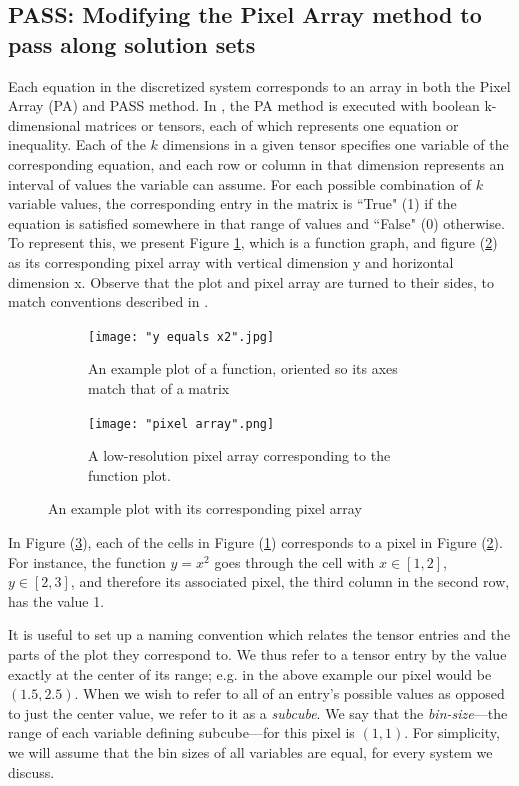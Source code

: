 \documentclass[11pt]{article}
\begin{document}
\subsection{PASS: Modifying the Pixel Array method to pass along solution sets}\label{sec:PASS}

Each equation in the discretized system corresponds to an array in both the Pixel Array (PA) and PASS method. In \citep{Introduction_to_PA}, the PA method is executed with boolean k-dimensional matrices or tensors, each of which represents one equation or inequality. Each of the $k$ dimensions in a given tensor specifies one variable of the corresponding equation, and each row or column in that dimension represents an interval of values the variable can assume. For each possible combination of $k$ variable values, the corresponding entry in the matrix is ``True" (1) if the equation is satisfied somewhere in that range of values and ``False" (0) otherwise. To represent this, we present Figure \cref{sample_function}, which is a function graph, and figure (\cref{sample_pixel_array}) as its corresponding pixel array with vertical dimension y and horizontal dimension x. Observe that the plot and pixel array are turned to their sides, to match conventions described in \citep{Introduction_to_PA}.

\begin{figure}[h]
\begin{subfigure}{.4\textwidth}
  \centering
  \captionsetup{width=0.8\textwidth}
  \texttt{[image: "y equals x2".jpg]}
  \caption{An example plot of a function, oriented so its axes match that of a matrix}
  \label{sample_function}
\end{subfigure}%
\begin{subfigure}{.4\textwidth}
  \centering
  \captionsetup{width=0.84\textwidth}
  \texttt{[image: "pixel array".png]}
  \caption{A low-resolution pixel array corresponding to the function plot.}
  \label{sample_pixel_array}
\end{subfigure}%
\caption{An example plot with its corresponding pixel array}
\label{plot_and_pa}
\end{figure}

In Figure (\ref{plot_and_pa}), each of the cells in Figure (\ref{sample_function}) corresponds to a pixel in Figure (\ref{sample_pixel_array}). For instance, the function $y=x^2$ goes through the cell with $x \in [1,2]$, $y \in [2,3]$, and therefore its associated pixel, the third column in the second row, has the value 1.

It is useful to set up a naming convention which relates the tensor entries and the parts of the plot they correspond to. We thus refer to a tensor entry by the value exactly at the center of its range; e.g. in the above example our pixel would be $(1.5, 2.5)$. When we wish to refer to all of an entry's possible values as opposed to just the center value, we refer to it as a \textit{subcube}. We say that the \textit{bin-size}---the range of each variable defining subcube---for this pixel is $(1,1)$. For simplicity, we will assume that the bin sizes of all variables are equal, for every system we discuss. 
\end{document}
